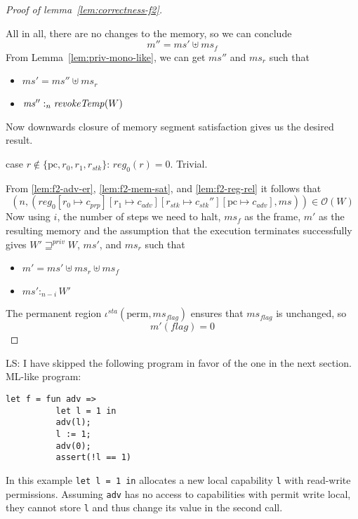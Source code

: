 \documentclass[a4paper]{article}
\newcommand{\update}[2]{[#1 \mapsto #2]}
\newcommand\lau[1]{{\color{purple} \sf \footnotesize {LS: #1}}\\}
\newcommand{\var}[1]{\mathit{#1}}
\newcommand{\hs}{\var{ms}}
\newcommand{\ms}{\hs}
\newcommand{\pcreg}{\mathrm{pc}}
\newcommand{\reg}{\var{reg}}
\newcommand{\heap}{\var{mem}}
\newcommand{\adv}{\var{adv}}
\newcommand{\stk}{\var{stk}}
\newcommand{\flag}{\var{flag}}
\newcommand{\sta}{\var{sta}}
\newcommand{\plainfun}[2]{
  \ifthenelse{\equal{#2}{}}
  {\mathit{#1}}
  {\mathit{#1}(#2)}
}
\newcommand{\revokeTemp}[1]{\plainfun{revokeTemp}{#1}}
\newcommand{\futurestr}{\mathbin{\sqsupseteq}^{\var{priv}}}
\newcommand{\heapSat}[3][\heap]{#1 :_{#2} #3}
\newcommand{\observations}{\mathcal{O}}
\newcommand{\npair}[2][n]{\left(#1,#2 \right)}
\newcommand{\plainview}[1]{\mathrm{#1}}
\newcommand{\perma}{\plainview{perm}}
\begin{document}
\begin{proof}[Proof of lemma~\ref{lem:correctness-f2}]
\begin{enumproof}[resume]
\begin{enumproof}
      All in all, there are no changes to the memory, so we can conclude
      \[
        m'' = \ms' \uplus \ms_f
      \]
      From Lemma~\ref{lem:priv-mono-like}, we can get $\ms''$ and $\ms_r$ such that
      \begin{itemize}
      \item $\ms' = \ms'' \uplus \ms_r$
      \item $\heapSat[\ms'']{n}{\revokeTemp{W}}$
      \end{itemize}
      Now downwards closure of memory segment satisfaction gives us the desired result.
    \item case $r\not\in \{\pcreg,r_0,r_1,r_\stk\}$: $\reg_0(r) = 0$. Trivial.
    \end{enumproof}
  \end{enumproof}
  From \ref{lem:f2-adv-er}, \ref{lem:f2-mem-sat}, and \ref{lem:f2-reg-rel} it follows that
  \[
    \npair{(\reg_0\update{r_0}{c_{\var{prp}}}\update{r_1}{c_\adv}\update{r_\stk}{c_\stk''}\update{\pcreg}{c_\adv},\ms)} \in \observations(W)
  \]
  Now using $i$, the number of steps we need to halt, $\ms_f$ as the frame, $m'$ as the resulting memory and the assumption that the execution terminates successfully gives $W' \futurestr W$, $\ms'$, and $\ms_r$ such that
  \begin{itemize}
  \item $m' = \ms' \uplus\ms_r \uplus \ms_f$
  \item $\heapSat[\ms']{n-i}{W'}$
  \end{itemize}
  The permanent region $\iota^\sta (\perma,\ms_\flag)$ ensures that $\ms_\flag$ is unchanged, so
  \[
    m'(\flag) = 0
  \]
\end{proof}

\lau{I have skipped the following program in favor of the one in the next section. }
              ML-like program:
\begin{verbatim}
let f = fun adv =>
          let l = 1 in
          adv(l);
          l := 1;
          adv(0);
          assert(!l == 1)
\end{verbatim}
              In this example \texttt{let l = 1 in} allocates a new local capability \texttt{l} with read-write permissions. Assuming \texttt{adv} has no access to capabilities with permit write local, they cannot store \texttt{l} and thus change its value in the second call.
\end{document}
